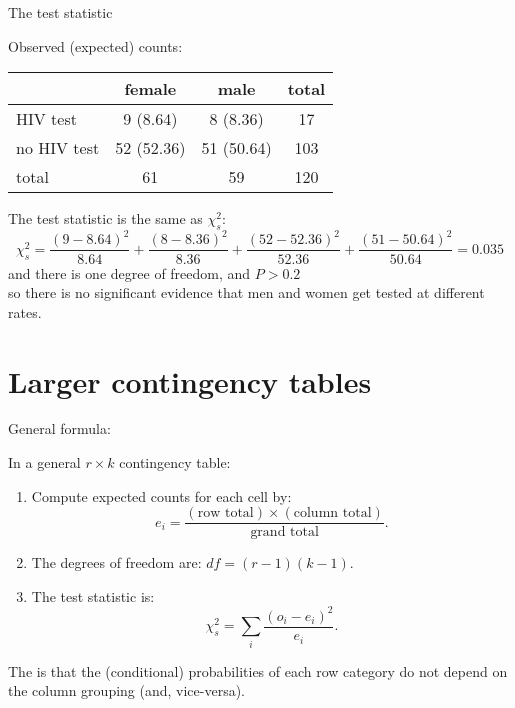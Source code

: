 \begin{frame}{The test statistic}

    Observed (expected) counts:
        \begin{center}
            \begin{tabular}{lcc|c}
                & female & male & total \\
                \hline
                HIV test & 9 (8.64) & 8 (8.36) & 17 \\
                no HIV test & 52 (52.36) & 51 (50.64) & 103 \\
                \hline
                total & 61 & 59 & 120 \\
            \end{tabular}
        \end{center}

    \vspace{2em}

    The test statistic is the \alert{same} as $\chi^2_s$:
    \[
        \chi^2_s = \frac{(9 - 8.64)^2}{8.64} + 
            \frac{(8 - 8.36)^2}{8.36} + 
            \frac{(52 - 52.36)^2}{52.36} + 
            \frac{(51 - 50.64)^2}{50.64} = 0.035
    \]
    and there is \alert{one} {degree of freedom}, and $P > 0.2$ \\
    so there is no significant evidence that men and women get tested at different rates.


\end{frame}

\section{Larger contingency tables}

\begin{frame}{General formula:}

    In a general $r \times k$ contingency table:
    \begin{enumerate}
        \item Compute expected counts for each cell by:
            \[ e_i = \frac{ (\text{row total}) \times (\text{column total}) }{ \text{grand total} } . \]
        \item The degrees of freedom are: $df = (r-1)(k-1)$.
        \item The test statistic is:
            \[ \chi^2_s = \sum_i \frac{ ( o_i - e_i )^2 }{ e_i } . \]
    \end{enumerate}

    \vspace{2em}

    The  is that the (conditional) probabilities of each row category
    do not depend on the column grouping
    (and, vice-versa).

\end{frame}

